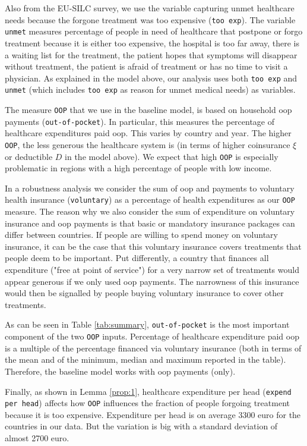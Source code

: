 \documentclass[a4paper,12pt]{article}
\begin{document}
Also from the EU-SILC survey, we use the variable capturing unmet healthcare needs because the forgone treatment was too expensive (\texttt{too exp}). The variable \texttt{unmet} measures percentage of people in need of healthcare that postpone or forgo treatment because it is either too expensive, the hospital is too far away, there is a waiting list for the treatment, the patient hopes that symptoms will disappear without treatment, the patient is afraid of treatment or has no time to visit a physician. As explained in the model above, our analysis uses both \texttt{too exp}  and \texttt{unmet} (which includes \texttt{too exp} as reason for unmet medical needs) as variables.

The measure \texttt{OOP} that we use in the baseline model, is based on household oop payments (\texttt{out-of-pocket}). In particular, this measures the percentage of healthcare expenditures paid oop. This varies by country and year. The higher \texttt{OOP}, the less generous the healthcare system is (in terms of higher coinsurance \(\xi\) or deductible \(D\) in the model above). We expect that high \texttt{OOP} is especially problematic in regions with a high percentage of people with low income.

In a robustness analysis we consider the sum of oop and payments to voluntary health insurance (\texttt{voluntary}) as a percentage of health expenditures as our \texttt{OOP} measure. The reason why we also consider the sum of expenditure on voluntary insurance and oop payments is that basic or mandatory insurance packages can differ between countries. If people are willing to spend money on voluntary insurance, it can be the case that this voluntary insurance covers treatments that people deem to be important. Put differently, a country that finances all expenditure ("free at point of service") for a very narrow set of treatments would appear generous if we only used oop payments. The narrowness of this insurance would then be signalled by people buying voluntary insurance to cover other treatments. 

As can be seen in Table \ref{tab:summary}, \texttt{out-of-pocket} is the most important component of the two \texttt{OOP} inputs. Percentage of healthcare expenditure paid oop is a multiple of the percentage financed via voluntary insurance (both in terms of the mean and of the minimum, median and maximum reported in the table). Therefore, the baseline model works with oop payments (only).

Finally, as shown in Lemma \ref{prop:1}, healthcare expenditure per head (\texttt{expend per head}) affects how \texttt{OOP} influences the fraction of people forgoing treatment because it is too expensive. Expenditure per head is on average 3300 euro for the countries in our data. But the variation is big with a standard deviation of almost 2700 euro.
\end{document}
